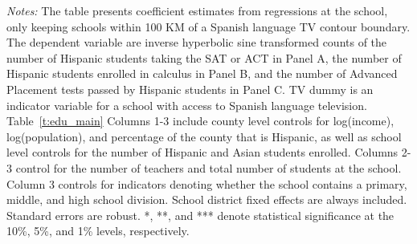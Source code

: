 \begin{table}[!htbp]
{\begin{threeparttable}
\begin{tablenotes}[flushleft]
				\item \textit{Notes:} The table presents coefficient estimates from regressions at the school, only keeping schools within 100 KM of a Spanish language TV contour boundary. The dependent variable are inverse hyperbolic sine transformed counts of the number of Hispanic students taking the SAT or ACT in Panel A, the number of Hispanic students enrolled in calculus in Panel B, and the number of Advanced Placement tests passed by Hispanic students in Panel C. TV dummy is an indicator variable for a school with access to Spanish language television. Table~\ref{t:edu_main}  Columns 1-3 include county level controls for log(income), log(population), and percentage of the county that is Hispanic, as well as school level controls for the number of Hispanic and Asian students enrolled. Columns 2-3 control for the number of teachers and total number of students at the school. Column 3 controls for indicators denoting whether the school contains a primary, middle, and high school division. School district fixed effects are always included. Standard errors are robust. *, **, and *** denote statistical significance at the 10\%, 5\%, and 1\% levels, respectively.
			\end{tablenotes}
		\end{threeparttable}
	}
\end{table}